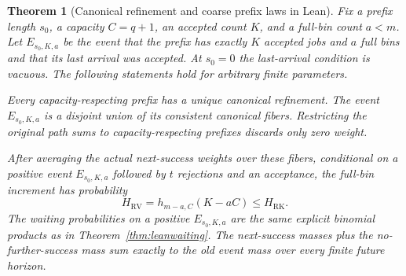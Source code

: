 \documentclass[11pt]{article}
\newtheorem{theorem}{Theorem}
\begin{document}
\begin{theorem}[Canonical refinement and coarse prefix laws in Lean]\label{thm:leanpartition}
Fix a prefix length $s_0$, a capacity $C=q+1$, an accepted count $K$,
and a full-bin count $a<m$. Let $E_{s_0,K,a}$ be the event that the
prefix has exactly $K$ accepted jobs and $a$ full bins and that its last
arrival was accepted. At $s_0=0$ the last-arrival condition is vacuous.
The following statements hold for arbitrary finite parameters.

Every capacity-respecting prefix has a unique canonical refinement.
The event $E_{s_0,K,a}$ is a disjoint union of its consistent canonical
fibers. Restricting the original path sums to capacity-respecting
prefixes discards only zero weight.

After averaging the actual next-success weights over these fibers,
conditional on a positive event $E_{s_0,K,a}$ followed by $t$ rejections
and an acceptance, the full-bin increment has probability
\[
 H_{\mathrm{RV}}=h_{m-a,C}(K-aC)
 \leq H_{\mathrm{RK}}.
\]
The waiting probabilities on a positive $E_{s_0,K,a}$ are the same
explicit binomial products as in Theorem~\ref{thm:leanwaiting}.
The next-success masses plus the no-further-success mass sum exactly
to the old event mass over every finite future horizon.
\end{theorem}
\end{document}
